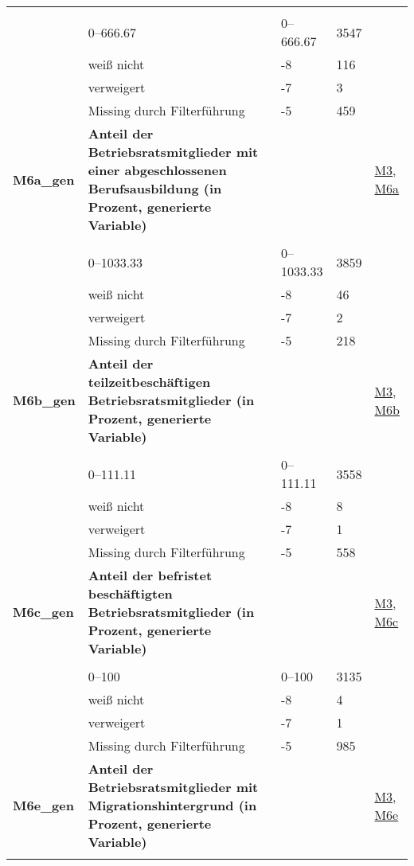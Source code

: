 \begin{longtable}{| L{2.5cm} | L{8.25cm}| C{1.5cm} | R{1.25cm} | C{2.25cm} |  }
   &  &  &  &  \\ 
   & 0--666.67 & 0--666.67 & 3547 &  \\ 
   & weiß nicht & -8 & 116 &  \\ 
   & verweigert & -7 & 3 &  \\ 
   & Missing durch Filterführung & -5 & 459 &  \\ 
   \midrule
\textbf{M6a\_gen}\label{var:suf:M6a:gen} & \textbf{Anteil der Betriebsratsmitglieder mit einer abgeschlossenen Berufsausbildung (in Prozent, generierte Variable)} &  &  & \hyperref[M3]{M3}, \hyperref[M6a]{M6a} \\ 
   &  &  &  &  \\ 
   & 0--1033.33 & 0--1033.33 & 3859 &  \\ 
   & weiß nicht & -8 & 46 &  \\ 
   & verweigert & -7 & 2 &  \\ 
   & Missing durch Filterführung & -5 & 218 &  \\ 
   \midrule
\textbf{M6b\_gen}\label{var:suf:M6b:gen} & \textbf{Anteil der teilzeitbeschäftigen Betriebsratsmitglieder (in Prozent, generierte Variable)} &  &  & \hyperref[M3]{M3}, \hyperref[M6b]{M6b} \\ 
   &  &  &  &  \\ 
   & 0--111.11 & 0--111.11 & 3558 &  \\ 
   & weiß nicht & -8 & 8 &  \\ 
   & verweigert & -7 & 1 &  \\ 
   & Missing durch Filterführung & -5 & 558 &  \\ 
   \midrule
\textbf{M6c\_gen}\label{var:suf:M6c:gen} & \textbf{Anteil der befristet beschäftigten Betriebsratsmitglieder (in Prozent, generierte Variable)} &  &  & \hyperref[M3]{M3}, \hyperref[M6c]{M6c} \\ 
   &  &  &  &  \\ 
   & 0--100 & 0--100 & 3135 &  \\ 
   & weiß nicht & -8 & 4 &  \\ 
   & verweigert & -7 & 1 &  \\ 
   & Missing durch Filterführung & -5 & 985 &  \\ 
   \midrule
\textbf{M6e\_gen}\label{var:suf:M6e:gen} & \textbf{Anteil der Betriebsratsmitglieder mit Migrationshintergrund (in Prozent, generierte Variable)} &  &  & \hyperref[M3]{M3}, \hyperref[M6e]{M6e} \\ 
   &  &  &  &  \\ 

\end{longtable}
